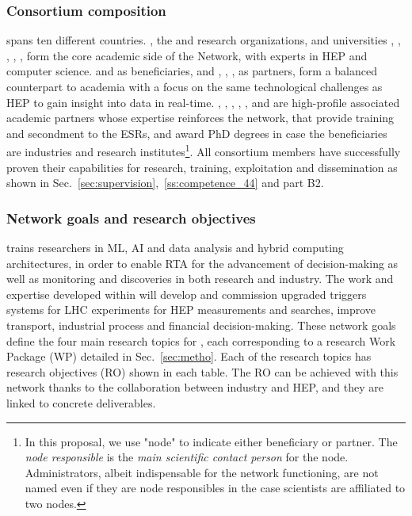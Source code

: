 \subsubsection*{Consortium composition}

\acronym spans ten different countries. 
\cernentity, the \nikhefentity and \cnrsentity research organizations, and universities \sorbonneentity, \helsinkientity, \unigeentity, \dortmundentity, \lundentity, \heidelbergentity form the core academic side of the Network, with experts in HEP and computer science.
\ibmentity and \fleetmaticsentity as beneficiaries, and \ximantisentity, \lightboxentity, \pointeightentity, as partners, form a balanced counterpart to academia with a focus on the same technological challenges as HEP to gain insight into data in real-time. 
\oregonentity, \ohioentity, \pisaentity, \santiagoentity, \liegesentity, \radboudentity and \amsterdamentity are high-profile associated academic partners whose expertise reinforces the network, that provide training and secondment to the ESRs, and award PhD degrees in case the beneficiaries are industries and research institutes\footnote{In this proposal, we use "node" to indicate
either beneficiary or partner. The \textit{node responsible} is the \textit{main scientific contact person} for the node. Administrators, albeit indispensable for the network functioning, are not named even if they are node responsibles in the case scientists are affiliated to two nodes.}.
All consortium members have successfully proven their capabilities for research, training, exploitation and dissemination as shown in Sec.~\ref{sec:supervision},~\ref{ss:competence_44} and part B2.

\subsubsection*{Network goals and research objectives}

\acronym trains researchers in ML, AI and data analysis and hybrid computing architectures, in order to enable RTA for the advancement of decision-making as well as monitoring and discoveries in both research and industry. 
The work and expertise developed within \acronym will develop and commission upgraded triggers systems for LHC experiments for HEP measurements and searches, improve transport, industrial process and financial decision-making. 
These network goals define the four main research topics for \acronym, each corresponding to a research Work Package (WP) detailed in Sec.~\ref{sec:metho}. 
Each of the research topics has research objectives (RO) shown in each table. The RO can be achieved with this network thanks to the collaboration between industry and HEP, and they are linked to concrete deliverables. 

